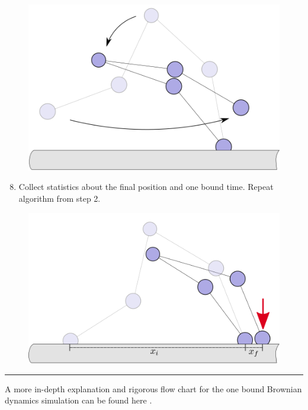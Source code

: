 \begin{figure}[H]
\centering
\includegraphics[width=0.7\columnwidth]{Figures/montecarlo5.png}
\label{fig:mc4}
\end{figure}

\begin{enumerate}
	\setcounter{enumi}{7}
	\item Collect statistics about the final position and one bound time. Repeat algorithm from step 2. 
\end{enumerate}

\begin{figure}[H]
\centering
\includegraphics[width=0.7\columnwidth]{Figures/montecarlo6.png}
\label{fig:mc4}
\end{figure}

\noindent\rule{16.5cm}{0.4pt}

A more in-depth explanation and rigorous flow chart for the one bound Brownian dynamics simulation can be found here \cite{Capek2017, }.



